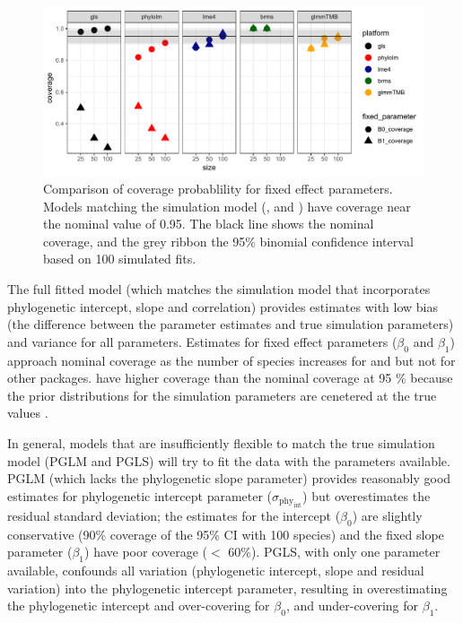 \documentclass[12pt]{article}
\begin{document}
\begin{center}
\begin{figure}[H]
  \includegraphics[scale=0.8]{./figure/sscoverage.pdf}
  \caption{Comparison of coverage probablility for fixed effect parameters. Models matching the simulation model (,  and ) have coverage near the nominal value of 0.95. The black line shows the nominal coverage, and the grey ribbon the 95\% binomial confidence interval based on 100 simulated fits.}
\label{ssplot_coverage}
\end{figure}
\end{center}

The full fitted model (which matches the simulation model that incorporates phylogenetic intercept, slope and correlation) provides estimates with low bias (the difference between the parameter estimates and true simulation parameters) and variance for all parameters. 
Estimates for fixed effect parameters ($\beta_0$ and $\beta_1$) approach nominal coverage as the number of species increases for  and  but not for other packages.  have higher coverage than the nominal coverage at 95 \% because the prior distributions for the simulation parameters are cenetered at the true values \citep{li2018fitting}.

In general, models that are insufficiently flexible to match the true simulation model (PGLM and PGLS) will try to fit the data with the parameters available. 
PGLM (which lacks the phylogenetic slope parameter) provides reasonably good estimates for phylogenetic intercept parameter ($\sigma_{\mathrm{phy_{int}}}$) but overestimates the residual standard deviation; the estimates for the intercept ($\beta_0$) are slightly conservative (90\% coverage of the 95\% CI with 100 species) and the fixed slope parameter ($\beta_1$) have poor coverage ($<$ 60\%).
PGLS, with only one parameter available, confounds all variation (phylogenetic intercept, slope and residual variation) into the phylogenetic intercept parameter, resulting in overestimating the phylogenetic intercept and over-covering for $\beta_0$, and under-covering for $\beta_1$.
\end{document}

